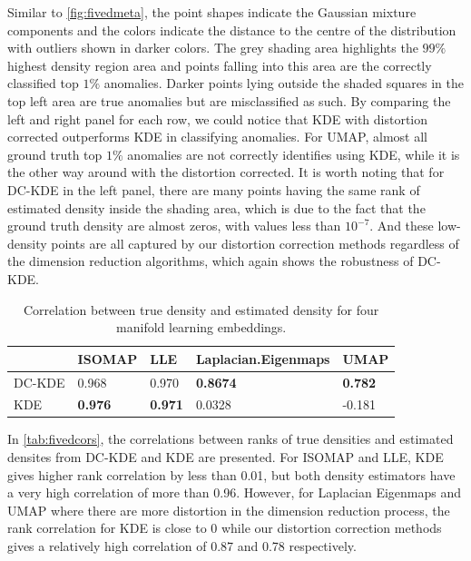 \documentclass[11pt,a4paper,]{article}
\begin{document}
Similar to \autoref{fig:fivedmeta}, the point shapes indicate the Gaussian mixture components and the colors indicate the distance to the centre of the distribution with outliers shown in darker colors. The grey shading area highlights the \(99\%\) highest density region area and points falling into this area are the correctly classified top \(1\%\) anomalies. Darker points lying outside the shaded squares in the top left area are true anomalies but are misclassified as such. By comparing the left and right panel for each row, we could notice that KDE with distortion corrected outperforms KDE in classifying anomalies. For UMAP, almost all ground truth top \(1\%\) anomalies are not correctly identifies using KDE, while it is the other way around with the distortion corrected. It is worth noting that for DC-KDE in the left panel, there are many points having the same rank of estimated density inside the shading area, which is due to the fact that the ground truth density are almost zeros, with values less than \(10^{-7}\). And these low-density points are all captured by our distortion correction methods regardless of the dimension reduction algorithms, which again shows the robustness of DC-KDE.

\begin{table}

\caption{\label{tab:fivedcors}Correlation between true density and estimated density for four manifold learning embeddings.}
\centering
\begin{tabular}[t]{l>{}l>{}l>{}l>{}l}
\toprule
  & ISOMAP & LLE & Laplacian.Eigenmaps & UMAP\\
\midrule
DC-KDE & 0.968 & 0.970 & \textbf{0.8674} & \textbf{0.782}\\
KDE & \textbf{0.976} & \textbf{0.971} & 0.0328 & -0.181\\
\bottomrule
\end{tabular}
\end{table}

In \autoref{tab:fivedcors}, the correlations between ranks of true densities and estimated densites from DC-KDE and KDE are presented. For ISOMAP and LLE, KDE gives higher rank correlation by less than 0.01, but both density estimators have a very high correlation of more than 0.96. However, for Laplacian Eigenmaps and UMAP where there are more distortion in the dimension reduction process, the rank correlation for KDE is close to 0 while our distortion correction methods gives a relatively high correlation of 0.87 and 0.78 respectively.
\end{document}
